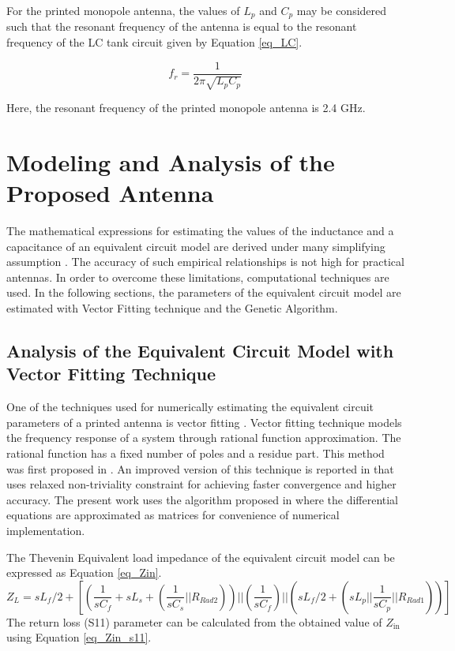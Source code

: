 For the printed monopole antenna, the values of $L_p$ and $C_p$ may be considered such that the resonant frequency of the antenna is equal to the resonant frequency of the LC tank circuit given by Equation \ref{eq_LC}.

\begin{equation}\label{eq_LC}
f_r = \frac{1}{2\pi \sqrt{L_p C_p}}
\end{equation}

Here, the resonant frequency of the printed monopole antenna is 2.4 GHz.

\section{Modeling and Analysis of the Proposed Antenna}\label{c4sec:analysis}
The mathematical expressions for estimating the values of the inductance and a capacitance of an equivalent circuit model are derived under many simplifying assumption \cite{handbook}. The accuracy of such empirical relationships is not high for practical antennas. In order to overcome these limitations, computational techniques are used. In the following sections, the parameters of the equivalent circuit model are estimated with Vector Fitting technique and the Genetic Algorithm.

\subsection{Analysis of the Equivalent Circuit Model with Vector Fitting Technique}
One of the techniques used for numerically estimating the equivalent circuit parameters of a printed antenna is vector fitting \cite{vectorfitting1, vectorfitting2, vectorfitting3}. Vector fitting technique models the frequency response of a system through rational function approximation. The rational function has a fixed number of poles and a residue part. This method was first proposed in \cite{vfit3_1}. An improved version of this technique is reported in \cite{vfit3_2} that uses relaxed non-triviality constraint for achieving faster convergence and higher accuracy. The present work uses the algorithm proposed in \cite{vfit3_3} where the differential equations are approximated as matrices for convenience of numerical implementation.

The Thevenin Equivalent load impedance of the equivalent circuit model can be expressed as Equation \ref{eq_Zin}.
{\small
\begin{equation}\label{eq_Zin}
Z_{L} = sL_f/2 + \left[\left(\frac{1}{sC_f}+sL_s+\left(\frac{1}{sC_s} || R_{Rad2}\right)\right) || \left(\frac{1}{sC_f}\right) || \left(sL_f/2 + \left(sL_p || \frac{1}{sC_p} || R_{Rad1}\right)\right)\right]
\end{equation}}
The return loss (S11) parameter can be calculated from the obtained value of $Z_{\text{in}}$ using Equation \ref{eq_Zin_s11}.

